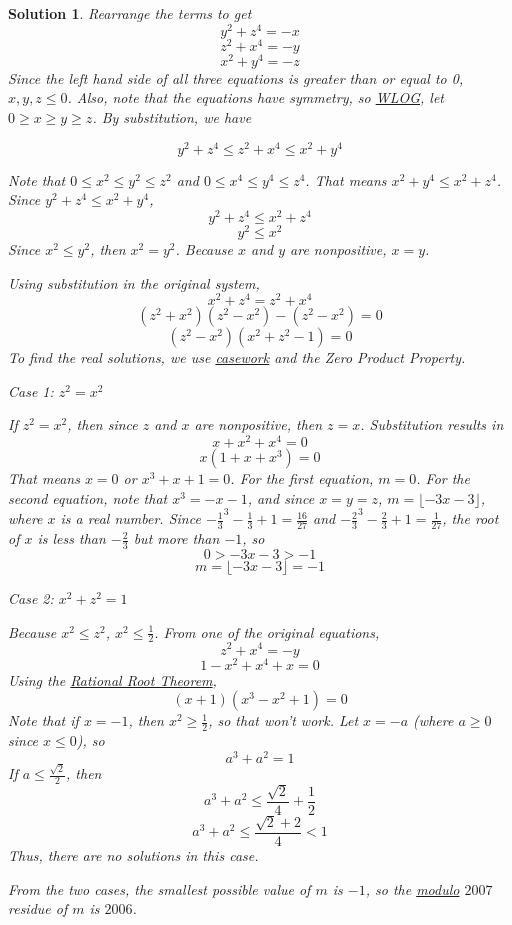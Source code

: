 \documentclass[12pt]{article}
\newtheorem*{solution*}{Solution}
\begin{document}
\begin{solution*}
Rearrange the terms to get
$$y^2 + z^4 = -x$$
$$z^2 + x^4 = -y$$
$$x^2 + y^4 = -z$$
Since the left hand side of all three equations is greater than or equal to 0, $x,y,z \le 0$.  Also, note that the equations have symmetry, so \href{https://artofproblemsolving.com/wiki/index.php/WLOG}{WLOG}, let $0 \ge x \ge y \ge z$.  By substitution, we have

$$y^2 + z^4 \le z^2 + x^4 \le x^2 + y^4$$

Note that $0 \le x^2 \le y^2 \le z^2$ and $0 \le x^4 \le y^4 \le z^4$. That means $x^2 + y^4 \le x^2 + z^4$.  Since $y^2 + z^4 \le x^2 + y^4$,
$$y^2 + z^4 \le x^2 + z^4$$
$$y^2 \le x^2$$
Since $x^2 \le y^2$, then $x^2 = y^2$.  Because $x$ and $y$ are nonpositive, $x = y$.


Using substitution in the original system,
$$x^2 + z^4 = z^2 + x^4$$
$$(z^2 + x^2)(z^2 - x^2) - (z^2 - x^2) = 0$$
$$(z^2 - x^2)(x^2 + z^2 - 1) = 0$$
To find the real solutions, we use \href{https://artofproblemsolving.com/wiki/index.php/Casework}{casework} and the Zero Product Property.

Case 1: $z^2 = x^2$

If $z^2 = x^2$, then since $z$ and $x$ are nonpositive, then $z = x$.  Substitution results in
$$x+x^2+x^4 = 0$$
$$x(1+x+x^3) = 0$$
That means $x = 0$ or $x^3 + x + 1 = 0$.  For the first equation, $m = 0$.  For the second equation, note that $x^3 = -x-1$, and since $x = y = z$, $m = \lfloor -3x-3 \rfloor$, where $x$ is a real number.  Since $-\tfrac{1}{3}^3 - \tfrac13 + 1 = \tfrac{16}{27}$ and $-\tfrac{2}{3}^3 - \tfrac23 + 1 = \tfrac{1}{27}$, the root of $x$ is less than $-\tfrac23$ but more than $-1$, so
$$0 > -3x-3 > -1$$
$$m = \lfloor -3x-3 \rfloor = -1$$

Case 2: $x^2 + z^2 = 1$

Because $x^2 \le z^2$, $x^2 \le \frac12$.  From one of the original equations,
$$z^2 + x^4 = -y$$
$$1 - x^2 + x^4 + x = 0$$
Using the \href{https://artofproblemsolving.com/wiki/index.php/Rational_Root_Theorem}{Rational Root Theorem},
$$(x+1)(x^3 - x^2 + 1) = 0$$
Note that if $x = -1$, then $x^2 \ge \tfrac12$, so that won’t work.  Let $x = -a$ (where $a \ge 0$ since $x \le 0$), so 
$$a^3 + a^2 = 1$$
If $a \le \tfrac{\sqrt2}{2}$, then
$$a^3 + a^2 \le \frac{\sqrt2}{4} + \frac12$$
$$a^3 + a^2 \le \frac{\sqrt2 + 2}{4} < 1$$
Thus, there are no solutions in this case.


From the two cases, the smallest possible value of $m$ is $-1$, so the \href{https://artofproblemsolving.com/wiki/index.php/Modulo}{modulo} $2007$ residue of $m$ is $\boxed{2006}$.
\end{solution*}
\end{document}
